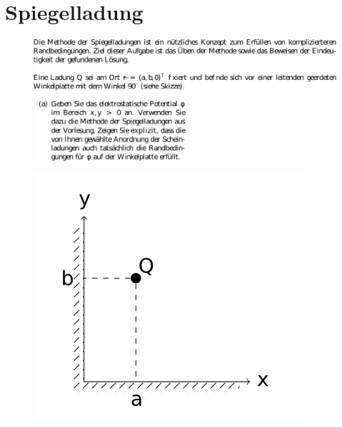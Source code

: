 \section{Spiegelladung}
\label{sec:Spiegelladung}
\begin{figure}
 \centering
 \includegraphics{media/spiegelladung.pdf}
 \label{fig:Spiegelladung}
\end{figure}
\begin{figure}
    \centering
    \includegraphics{media/Skizze.png}
    \label{fig:Spiegelladung}
   \end{figure}
\pagebreak
